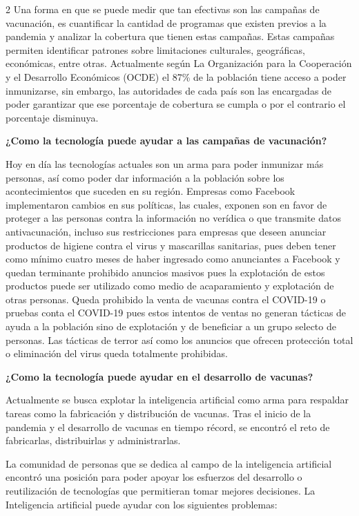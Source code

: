 \documentclass[12pt,spanish,Letterpaper,openany]{book}
\begin{document}
\begin {multicols}{2}
Una forma en que se puede medir que tan efectivas son las campañas de vacunación, es
cuantificar la cantidad de programas que existen previos a la pandemia y analizar la cobertura
que tienen estas campañas. Estas campañas permiten identificar patrones sobre limitaciones
culturales, geográficas, económicas, entre otras. Actualmente según La Organización para la
Cooperación y el Desarrollo Económicos (OCDE) el 87\% de la población tiene acceso a
poder inmunizarse, sin embargo, las autoridades de cada país son las encargadas de poder
garantizar que ese porcentaje de cobertura se cumpla o por el contrario el porcentaje
disminuya.

\textbf{¿Como la tecnología puede ayudar a las campañas de vacunación?}

Hoy en día las tecnologías actuales son un arma para poder inmunizar más personas, así como
poder dar información a la población sobre los acontecimientos que suceden en su región.
Empresas como Facebook implementaron cambios en sus políticas, las cuales, exponen son
en favor de proteger a las personas contra la información no verídica o que transmite datos
antivacunación, incluso sus restricciones para empresas que deseen anunciar productos de
higiene contra el virus y mascarillas sanitarias, pues deben tener como mínimo cuatro meses
de haber ingresado como anunciantes a Facebook y quedan terminante prohibido anuncios
masivos pues la explotación de estos productos puede ser utilizado como medio de
acaparamiento y explotación de otras personas. Queda prohibido la venta de vacunas contra
el COVID-19 o pruebas conta el COVID-19 pues estos intentos de ventas no generan tácticas
de ayuda a la población sino de explotación y de beneficiar a un grupo selecto de personas.
Las tácticas de terror así como los anuncios que ofrecen protección total o eliminación del
virus queda totalmente prohibidas.

\textbf{¿Como la tecnología puede ayudar en el desarrollo de vacunas?}

Actualmente se busca explotar la inteligencia artificial como arma para respaldar tareas como
la fabricación y distribución de vacunas. Tras el inicio de la pandemia y el desarrollo de
vacunas en tiempo récord, se encontró el reto de fabricarlas, distribuirlas y administrarlas.

La comunidad de personas que se dedica al campo de la inteligencia artificial encontró una
posición para poder apoyar los esfuerzos del desarrollo o reutilización de tecnologías que
permitieran tomar mejores decisiones. La Inteligencia artificial puede ayudar con los
siguientes problemas:


\end{multicols}
\end{document}
